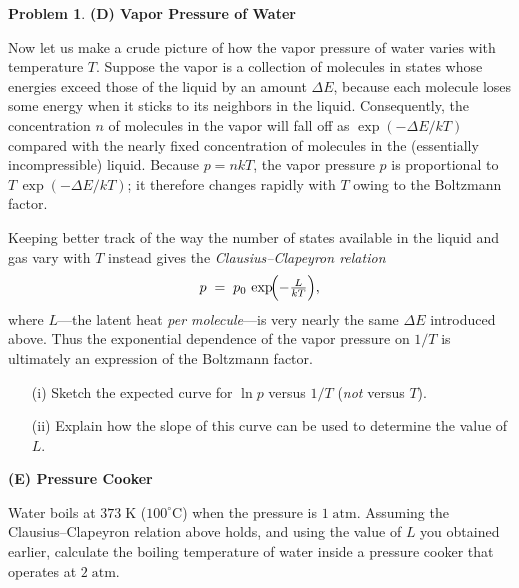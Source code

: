 \documentclass[10pt]{article}
\theoremstyle{definition} %
\newtheorem{problem}{Problem}
\theoremstyle{plain} %
\begin{document}
                  \begin{problem}
                    \textbf{(D) Vapor Pressure of Water}
                    
                    Now let us make a crude picture of how the vapor pressure of water varies
                    with temperature \(T\).
                    Suppose the vapor is a collection of molecules in states whose energies
                    exceed those of the liquid by an amount \(\Delta E\), because each molecule
                    loses some energy when it sticks to its neighbors in the liquid.
                    Consequently, the concentration \(n\) of molecules in the vapor will fall
                    off as \(\exp(-\Delta E/kT)\) compared with the nearly fixed concentration
                    of molecules in the (essentially incompressible) liquid.
                    Because \(p = nkT\), the vapor pressure \(p\) is proportional to
                    \(T\,\exp(-\Delta E/kT)\); it therefore changes rapidly with \(T\) owing to
                    the Boltzmann factor.
                    
                    Keeping better track of the way the number of states available in the
                    liquid and gas vary with \(T\) instead gives the
                    \emph{Clausius--Clapeyron relation}
                    \[
                       p \;=\; p_{0}\,\exp\!\Bigl(-\tfrac{L}{kT}\Bigr),
                    \]
                    where \(L\)---the latent heat \emph{per molecule}---is very nearly the same
                    \(\Delta E\) introduced above.
                    Thus the exponential dependence of the vapor pressure on \(1/T\) is
                    ultimately an expression of the Boltzmann factor.
                    
                    \begin{enumerate}
                      \item[(i)] Sketch the expected curve for \(\ln p\) versus \(1/T\)
                                 (\emph{not} versus \(T\)).
                      \item[(ii)] Explain how the slope of this curve can be used to determine
                                  the value of \(L\).
                    \end{enumerate}
                    
                    \bigskip
                    \textbf{(E) Pressure Cooker}
                    
                    Water boils at \(373\;\text{K}\) (\(100^{\circ}\text{C}\)) when the
                    pressure is \(1\;\text{atm}\).
                    Assuming the Clausius--Clapeyron relation above holds, and using the value
                    of \(L\) you obtained earlier, calculate the boiling temperature of water
                    inside a pressure cooker that operates at \(2\;\text{atm}\).
                    \end{problem}
\end{document}
